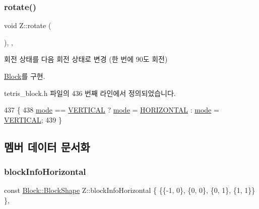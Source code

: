 \subsubsection{\texorpdfstring{rotate()}{rotate()}}
{\footnotesize\ttfamily void Z\+::rotate (\begin{DoxyParamCaption}{ }\end{DoxyParamCaption})\hspace{0.3cm}{\ttfamily [inline]}, {\ttfamily [override]}, {\ttfamily [virtual]}}



회전 상태를 다음 회전 상태로 변경 (한 번에 90도 회전) 



\mbox{\hyperlink{class_block_af1499ad7e48fb750581b471d0d5bb0e0}{Block}}를 구현.



tetris\+\_\+block.\+h 파일의 436 번째 라인에서 정의되었습니다.


\begin{DoxyCode}
437     \{
438         \mbox{\hyperlink{class_z_a8324fb6e9f23196a9649ab838aabcc74}{mode}} == \mbox{\hyperlink{class_block_a33a96023993478ad4b52426188454765a76628d7877667ccb2f6e549b89466a4a}{VERTICAL}} ? \mbox{\hyperlink{class_z_a8324fb6e9f23196a9649ab838aabcc74}{mode}} = \mbox{\hyperlink{class_block_a33a96023993478ad4b52426188454765a883bda1b4a0cb6d25d8b3c3465f0cfef}{HORIZONTAL}} : \mbox{\hyperlink{class_z_a8324fb6e9f23196a9649ab838aabcc74}{mode}} = 
      \mbox{\hyperlink{class_block_a33a96023993478ad4b52426188454765a76628d7877667ccb2f6e549b89466a4a}{VERTICAL}};
439     \}
\end{DoxyCode}


\subsection{멤버 데이터 문서화}
\mbox{\label{class_z_a2e59d23428e1ad155832c0f5a118e25e}} 
\subsubsection{\texorpdfstring{block\+Info\+Horizontal}{blockInfoHorizontal}}
{\footnotesize\ttfamily const \mbox{\hyperlink{class_block_aca5d951639f113e2ebd7856209d6b9ab}{Block\+::\+Block\+Shape}} Z\+::block\+Info\+Horizontal \{ \{\{-\/1, 0\}, \{0, 0\}, \{0, 1\}, \{1, 1\}\} \}\hspace{0.3cm}{\ttfamily [static]}, {\ttfamily [private]}}



